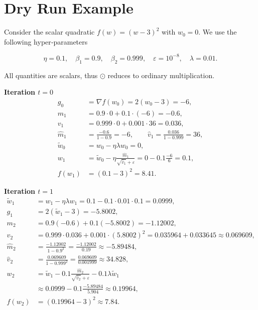 \documentclass{article}
\begin{document}
\section*{Dry Run Example}
Consider the scalar quadratic $f(w)=(w-3)^{2}$ with $w_{0}=0$.
We use the following hyper‑parameters  

\[
\eta=0.1,\quad\beta_{1}=0.9,\quad\beta_{2}=0.999,\quad\varepsilon=10^{-8},
\quad\lambda=0.01.
\]

All quantities are scalars, thus $\odot$ reduces to ordinary multiplication.

\medskip
\noindent\textbf{Iteration $t=0$}
\[
\begin{aligned}
g_{0}&=\nabla f(w_{0})=2(w_{0}-3)=-6,\\
m_{1}&=0.9\cdot0+0.1\cdot(-6)=-0.6,\\
v_{1}&=0.999\cdot0+0.001\cdot36=0.036,\\
\hat m_{1}&=\frac{-0.6}{1-0.9}= -6,\qquad
\hat v_{1}= \frac{0.036}{1-0.999}=36,\\
\tilde w_{0}&= w_{0}-\eta\lambda w_{0}=0,\\
w_{1}&= \tilde w_{0}
        -\eta\frac{\hat m_{1}}{\sqrt{\hat v_{1}}+\varepsilon}
        =0-0.1\frac{-6}{6}=0.1,\\
f(w_{1})&=(0.1-3)^{2}=8.41 .
\end{aligned}
\]

\medskip
\noindent\textbf{Iteration $t=1$}
\[
\begin{aligned}
\tilde w_{1}&= w_{1}-\eta\lambda w_{1}
            =0.1-0.1\cdot0.01\cdot0.1=0.0999,\\
g_{1}&=2(\tilde w_{1}-3)=-5.8002,\\
m_{2}&=0.9(-0.6)+0.1(-5.8002)=-1.12002,\\
v_{2}&=0.999\cdot0.036+0.001\cdot(5.8002)^{2}
      =0.035964+0.033645\approx0.069609,\\
\hat m_{2}&=\frac{-1.12002}{1-0.9^{2}}
           =\frac{-1.12002}{0.19}\approx-5.89484,\\
\hat v_{2}&=\frac{0.069609}{1-0.999^{2}}
           =\frac{0.069609}{0.001999}\approx34.828,\\
w_{2}&= \tilde w_{1}
        -0.1\frac{\hat m_{2}}{\sqrt{\hat v_{2}}+\varepsilon}
        -0.1\lambda \tilde w_{1}\\
     &\approx 0.0999-0.1\frac{-5.89484}{5.904}
        \approx0.19964,\\
f(w_{2})&=(0.19964-3)^{2}\approx7.84 .
\end{aligned}
\]
\end{document}
